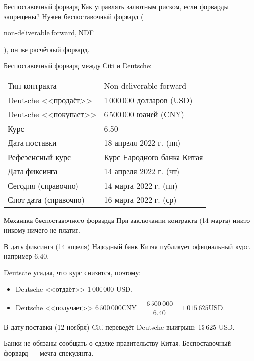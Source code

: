 \documentclass{beamer}
\newcommand{\en}[1]{\begin{otherlanguage}{english}#1\end{otherlanguage}}
\begin{document}
\begin{frame}{Беспоставочный форвард}
\justify
Как управлять валютным риском, если форварды запрещены? Нужен \alert{беспоставочный форвард} (\en{non-deliverable forward, NDF}), он же расчётный форвард.

\justify
Беспоставочный форвард между Citi и Deutsche:

\justify
\centering
\begin{tabular}{l|l}
	Тип контракта 		   & Non-deliverable forward		\\
	Deutsche <<продаёт>>  & 1\,000\,000 долларов (USD)	\\
	Deutsche <<покупает>> & 6\,500\,000 юаней (CNY)		\\
	Курс		 		      & 6.50 						\\
	Дата поставки		   & 18 апреля 2022 г. (пн) \\
	Референсный курс	   & Курс Народного банка Китая	\\
	Дата фиксинга		   & 14 апреля 2022 г. (чт) \\
	Сегодня (справочно)	& 14 марта 2022 г. (пн) \\
	Спот-дата (справочно) & 16 марта 2022 г. (ср)
\end{tabular}
\end{frame}



\begin{frame}{Механика беспоставочного форварда}
\justify
При заключении контракта (14 марта) никто никому ничего не платит.

\justify
В дату фиксинга (14 апреля) Народный банк Китая публикует официальный курс, например 6.40.

\justify
Deutsche угадал, что курс снизится, поэтому:
\begin{itemize}
\justifying
\item Deutsche <<отдаёт>> 1\,000\,000 USD.
\item Deutsche <<получает>> $6\,500\,000 \text{CNY} = \dfrac{6\,500\,000}{6.40} = 1\,015\,625 \text{USD}$.
\end{itemize}

\justify
В дату поставки (12 ноября) Citi переведёт Deutsche выигрыш: 15\,625 USD.

\justify Банки не обязаны сообщать о сделке правительству Китая. Беспоставочный форвард --- мечта спекулянта.
\end{frame}
\end{document}

